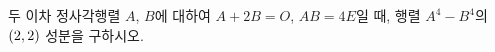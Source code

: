 두 이차 정사각행렬 $A$, $B$에 대하여 $A+2B=O$, $AB=4E$일 때, 행렬 $A^4-B^4$의 $(2{,}\mkern3mu\mathopen{}2)$ 성분을 구하시오.
